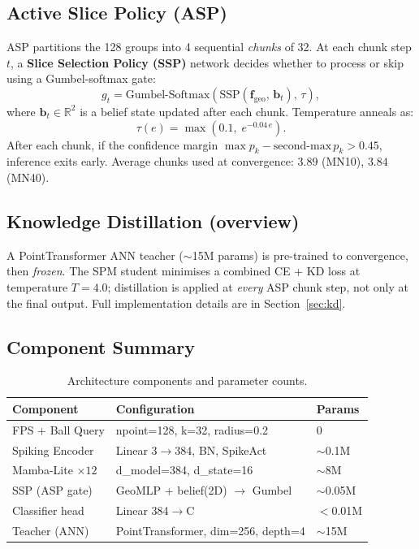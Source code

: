 \documentclass[11pt,a4paper]{article}
\begin{document}
\subsection{Active Slice Policy (ASP)}

ASP partitions the 128 groups into 4 sequential \emph{chunks} of 32. At each chunk step $t$, a \textbf{Slice Selection Policy (SSP)} network decides whether to process or skip using a Gumbel-softmax gate:
\[
g_t = \text{Gumbel-Softmax}\!\left(\text{SSP}\!\left(\mathbf{f}_{\text{geo}},\, \mathbf{b}_t\right),\, \tau\right),
\]
where $\mathbf{b}_t \in \mathbb{R}^2$ is a belief state updated after each chunk. Temperature anneals as:
\[
\tau(e) = \max\!\left(0.1,\; e^{-0.04\,e}\right).
\]
After each chunk, if the confidence margin $\max p_k - \text{second-max}\, p_k > 0.45$, inference exits early. Average chunks used at convergence: $3.89$ (MN10), $3.84$ (MN40).

\subsection{Knowledge Distillation (overview)}

A PointTransformer ANN teacher ($\sim$15M params) is pre-trained to convergence, then \emph{frozen}. The SPM student minimises a combined CE + KD loss at temperature $T=4.0$; distillation is applied at \emph{every} ASP chunk step, not only at the final output. Full implementation details are in Section~\ref{sec:kd}.

\subsection{Component Summary}

\begin{table}[H]
\centering
\caption{Architecture components and parameter counts.}
\begin{tabular}{L{4cm} L{6.5cm} C{3cm}}
\toprule
\textbf{Component} & \textbf{Configuration} & \textbf{Params} \\
\midrule
FPS + Ball Query & npoint=128, k=32, radius=0.2 & 0 \\
Spiking Encoder & Linear 3$\to$384, BN, SpikeAct & $\sim$0.1M \\
Mamba-Lite $\times 12$ & d\_model=384, d\_state=16 & $\sim$8M \\
SSP (ASP gate) & GeoMLP + belief(2D) $\to$ Gumbel & $\sim$0.05M \\
Classifier head & Linear 384$\to$C & $<$0.01M \\
\midrule
Teacher (ANN) & PointTransformer, dim=256, depth=4 & $\sim$15M \\
\bottomrule
\end{tabular}
\end{table}
\end{document}

